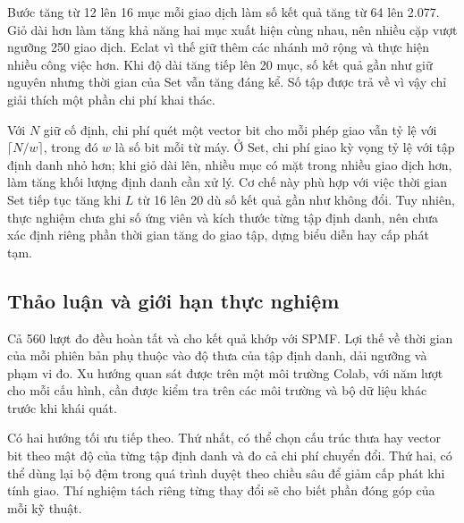 Bước tăng từ 12 lên 16 mục mỗi giao dịch làm số kết quả tăng từ
64 lên 2.077. Giỏ dài hơn làm tăng khả năng hai mục xuất hiện cùng
nhau, nên nhiều cặp vượt ngưỡng 250 giao dịch. Eclat vì thế giữ thêm
các nhánh mở rộng và thực hiện nhiều công việc hơn. Khi độ dài tăng
tiếp lên 20 mục, số kết quả gần như giữ nguyên nhưng thời gian của
Set vẫn tăng đáng kể. Số tập được trả về vì vậy chỉ giải thích một
phần chi phí khai thác.

Với $N$ giữ cố định, chi phí quét một vector bit cho mỗi phép giao
vẫn tỷ lệ với $\lceil N/w\rceil$, trong đó $w$ là số bit mỗi từ máy.
Ở Set, chi phí giao kỳ vọng tỷ lệ với tập định danh nhỏ hơn; khi
giỏ dài lên, nhiều mục có mặt trong nhiều giao dịch hơn, làm tăng
khối lượng định danh cần xử lý. Cơ chế này phù hợp với việc thời gian
Set tiếp tục tăng khi $L$ từ 16 lên 20 dù số kết quả gần như không đổi.
Tuy nhiên, thực nghiệm chưa ghi số ứng viên và kích thước từng tập
định danh, nên chưa xác định riêng phần thời gian tăng do giao tập,
dựng biểu diễn hay cấp phát tạm.

\subsection{Thảo luận và giới hạn thực nghiệm}
Cả 560 lượt đo đều hoàn tất và cho kết quả khớp với SPMF. Lợi thế về
thời gian của mỗi phiên bản phụ thuộc vào độ thưa của tập định danh,
dải ngưỡng và phạm vi đo. Xu hướng quan sát được trên một môi trường
Colab, với năm lượt cho mỗi cấu hình, cần được kiểm tra trên các môi
trường và bộ dữ liệu khác trước khi khái quát.

Có hai hướng tối ưu tiếp theo. Thứ nhất, có thể chọn cấu trúc thưa
hay vector bit theo mật độ của từng tập định danh và đo cả chi phí
chuyển đổi. Thứ hai, có thể dùng lại bộ đệm trong quá trình duyệt
theo chiều sâu để giảm cấp phát khi tính giao. Thí nghiệm tách
riêng từng thay đổi sẽ cho biết phần đóng góp của mỗi kỹ thuật.
